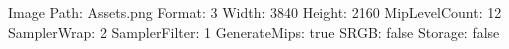 Image Path: Assets\Textures\Backgroundfield.png
Format: 3
Width: 3840
Height: 2160
MipLevelCount: 12
SamplerWrap: 2
SamplerFilter: 1
GenerateMips: true
SRGB: false
Storage: false